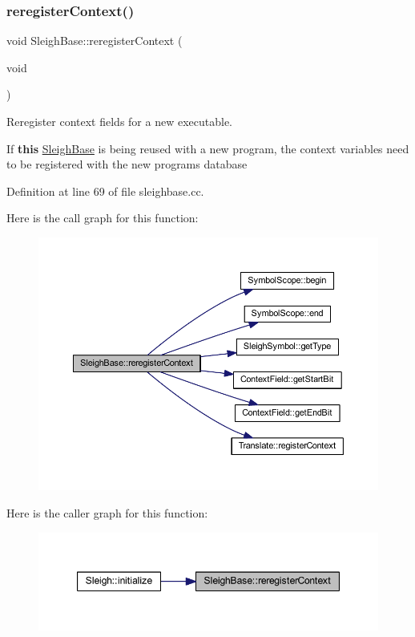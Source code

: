 \subsubsection{\texorpdfstring{reregisterContext()}{reregisterContext()}}
{\footnotesize\ttfamily void Sleigh\+Base\+::reregister\+Context (\begin{DoxyParamCaption}\item[{void}]{ }\end{DoxyParamCaption})\hspace{0.3cm}{\ttfamily [protected]}}



Reregister context fields for a new executable. 

If {\bfseries{this}} \mbox{\hyperlink{class_sleigh_base}{Sleigh\+Base}} is being reused with a new program, the context variables need to be registered with the new program\textquotesingle{}s database 

Definition at line 69 of file sleighbase.\+cc.

Here is the call graph for this function\+:
\nopagebreak
\begin{figure}[H]
\begin{center}
\leavevmode
\includegraphics[width=350pt]{class_sleigh_base_a8d6034782b1d4ada68289054d4cdf8c3_cgraph}
\end{center}
\end{figure}
Here is the caller graph for this function\+:
\nopagebreak
\begin{figure}[H]
\begin{center}
\leavevmode
\includegraphics[width=347pt]{class_sleigh_base_a8d6034782b1d4ada68289054d4cdf8c3_icgraph}
\end{center}
\end{figure}
\mbox{\label{class_sleigh_base_a4f2cd05135b68d2bafb549cfe87d3be5}} 
